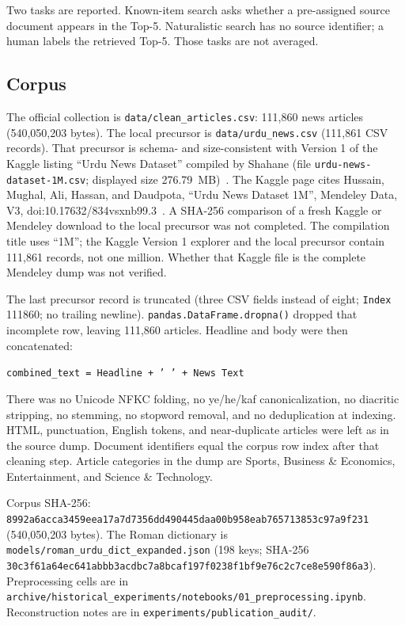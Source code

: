 \documentclass[10pt,letterpaper]{article}
\begin{document}
Two tasks are reported. Known-item search asks whether a pre-assigned source document appears in the Top-5. Naturalistic search has no source identifier; a human labels the retrieved Top-5. Those tasks are not averaged.

\subsection*{Corpus}

The official collection is \texttt{data/clean\_articles.csv}: 111,860 news articles (540,050,203 bytes). The local precursor is \texttt{data/urdu\_news.csv} (111,861 CSV records). That precursor is schema- and size-consistent with Version 1 of the Kaggle listing ``Urdu News Dataset'' compiled by Shahane (file \texttt{urdu-news-dataset-1M.csv}; displayed size 276.79~MB)~\cite{bib17}. The Kaggle page cites Hussain, Mughal, Ali, Hassan, and Daudpota, ``Urdu News Dataset 1M'', Mendeley Data, V3, doi:10.17632/834vsxnb99.3~\cite{bib16}. A SHA-256 comparison of a fresh Kaggle or Mendeley download to the local precursor was not completed. The compilation title uses ``1M''; the Kaggle Version 1 explorer and the local precursor contain 111,861 records, not one million. Whether that Kaggle file is the complete Mendeley dump was not verified.

The last precursor record is truncated (three CSV fields instead of eight; \texttt{Index} 111860; no trailing newline). \texttt{pandas.DataFrame.dropna()} dropped that incomplete row, leaving 111,860 articles. Headline and body were then concatenated:

\texttt{combined\_text = Headline + ' ' + News Text}

There was no Unicode NFKC folding, no ye/he/kaf canonicalization, no diacritic stripping, no stemming, no stopword removal, and no deduplication at indexing. HTML, punctuation, English tokens, and near-duplicate articles were left as in the source dump. Document identifiers equal the corpus row index after that cleaning step. Article categories in the dump are Sports, Business \& Economics, Entertainment, and Science \& Technology.

Corpus SHA-256: \texttt{8992a6acca3459eea17a7d7356dd490445daa00b958eab765713853c97a9f231} (540,050,203 bytes). The Roman dictionary is \texttt{models/roman\_urdu\_dict\_expanded.json} (198 keys; SHA-256 \texttt{30c3f61a64ec641abbb3acdbc7a8bcaf197f0238f1bf9e76c2c7ce8e590f86a3}). Preprocessing cells are in \texttt{archive/historical\_experiments/notebooks/01\_preprocessing.ipynb}. Reconstruction notes are in \texttt{experiments/publication\_audit/}.
\end{document}
